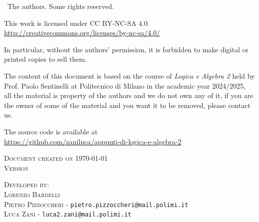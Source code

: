 
\textcopyright \ The authors. Some rights reserved.

This work is licensed under CC BY-NC-SA 4.0.\\
\url{http://creativecommons.org/licenses/by-nc-sa/4.0/}

In particular, without the authors' permission, it is forbidden to make digital or printed copies to sell them.

The content of this document is based on the course of \textit{Logica e Algebra 2} held by Prof. Paolo Sentinelli at Politecnico di Milano in the academic year 2024/2025, all the material is property of the authors and we do not own any of it, if you are the owner of some of the material and you want it to be removed, please contact us.

The \latex source code is available at\\
\url{https://github.com/zaniluca/appunti-di-logica-e-algebra-2}


\textsc{Document created on \today}
\\\textsc{Version} \texttt{\commithash}


\textsc{Developed by:}\\
\textsc{Lorenzo Bardelli}\\
\textsc{Pietro Pizzoccheri} - \texttt{pietro.pizzoccheri@mail.polimi.it}\\
\textsc{Luca Zani} - \texttt{luca2.zani@mail.polimi.it}\\

